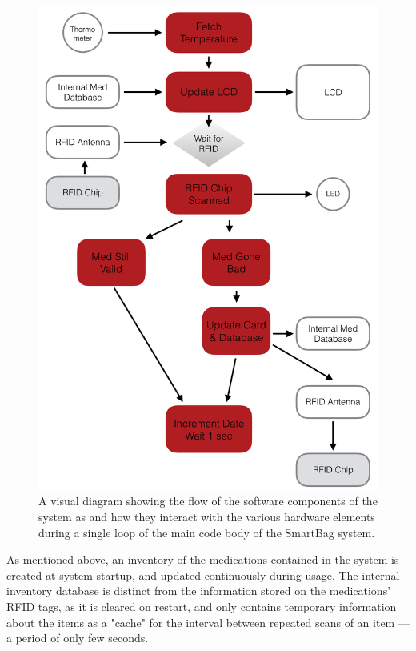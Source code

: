 \documentclass{sigchi}
\begin{document}
\begin{figure}[!ht]
\centering
\includegraphics[width=\columnwidth]{software_loop}
\caption{A visual diagram showing the flow of the software components
	of the system as and how they interact with the various hardware
    elements during a single loop of the main code body of the SmartBag
    system.}
\label{fig:software_diagram}
\end{figure}

As mentioned above, an inventory of the medications contained in the system
is created at system startup, and updated continuously during usage. The 
internal inventory database is distinct from the information stored on the
medications' RFID tags, as it is cleared on restart, and only contains
temporary information about the items as a "cache" for the interval between
repeated scans of an item --- a period of only few seconds.
\end{document}
